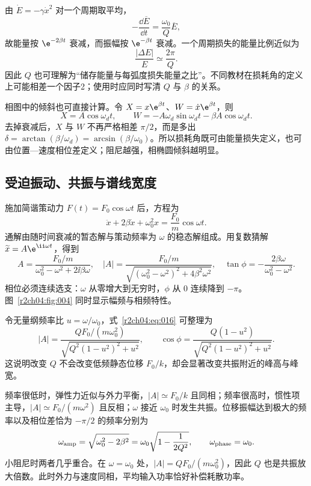由 $\dot E=-\gamma\dot x^2$ 对一个周期取平均，
\[
 -\frac{\dd\overline E}{\dd t}
 =\frac{\omega_0}{Q}\overline E,
\]
故能量按 $\e^{-2\beta t}$ 衰减，而振幅按 $\e^{-\beta t}$ 衰减。一个周期损失的能量比例近似为
\[
 \frac{|\Delta E|}{E}\simeq\frac{2\pi}{Q}.
\]
因此 $Q$ 也可理解为“储存能量与每弧度损失能量之比”。不同教材在损耗角的定义上可能相差一个因子2；使用时应同时写清 $Q$ 与 $\beta$ 的关系。

相图中的倾斜也可直接计算。令
$X=x\e^{\beta t}$、$W=\dot x\e^{\beta t}$，则
\[
 X=A\cos\omega_dt,\qquad
 W=-A\omega_d\sin\omega_dt-\beta A\cos\omega_dt.
\]
去掉衰减后，$X$ 与 $W$ 不再严格相差 $\pi/2$，而是多出
$\delta=\arctan(\beta/\omega_d)=\arcsin(\beta/\omega_0)$。所以损耗角既可由能量损失定义，也可由位置—速度相位差定义；阻尼越强，相椭圆倾斜越明显。
\figDampedPhase

\subsection{受迫振动、共振与谱线宽度}

施加简谐策动力 $F(t)=F_0\cos\omega t$ 后，方程为
\begin{equation}
 \ddot x+2\beta\dot x+\omega_0^2x=\frac{F_0}{m}\cos\omega t.
 \label{r2ch04:eq:015}
\end{equation}
通解由随时间衰减的暂态解与策动频率为 $\omega$ 的稳态解组成。用复数猜解 $\widetilde x=A\e^{\ii\omega t}$，得到
\begin{equation}
 A=\frac{F_0/m}{\omega_0^2-\omega^2+2\ii\beta\omega},\quad
 |A|=\frac{F_0/m}{\sqrt{(\omega_0^2-\omega^2)^2+4\beta^2\omega^2}},\quad
 \tan\phi=-\frac{2\beta\omega}{\omega_0^2-\omega^2}.
 \label{r2ch04:eq:016}
\end{equation}
相位必须连续选支：$\omega$ 从零增大到无穷时，$\phi$ 从 $0$ 连续降到 $-\pi$。图~\ref{r2ch04:fig:004} 同时显示幅频与相频特性。

令无量纲频率比 $u=\omega/\omega_0$，式~\eqref{r2ch04:eq:016} 可整理为
\[
 |A|=\frac{QF_0/(m\omega_0^2)}
 {\sqrt{Q^2(1-u^2)^2+u^2}},\qquad
 \cos\phi=\frac{Q(1-u^2)}
 {\sqrt{Q^2(1-u^2)^2+u^2}}.
\]
这说明改变 $Q$ 不会改变低频静态位移 $F_0/k$，却会显著改变共振附近的峰高与峰宽。
\figForcedResponse

频率很低时，弹性力近似与外力平衡，$|A|\simeq F_0/k$ 且同相；频率很高时，惯性项主导，$|A|\simeq F_0/(m\omega^2)$ 且反相；$\omega$ 接近 $\omega_0$ 时发生共振。位移振幅达到极大的频率以及相位差恰为 $-\pi/2$ 的频率分别为
\begin{equation}
 \omega_{\rm amp}=\sqrt{\omega_0^2-2\beta^2}
 =\omega_0\sqrt{1-\frac1{2Q^2}},\qquad
 \omega_{\rm phase}=\omega_0.
 \label{r2ch04:eq:017}
\end{equation}
小阻尼时两者几乎重合。在 $\omega=\omega_0$ 处，$|A|=QF_0/(m\omega_0^2)$，因此 $Q$ 也是共振放大倍数。此时外力与速度同相，平均输入功率恰好补偿耗散功率。

